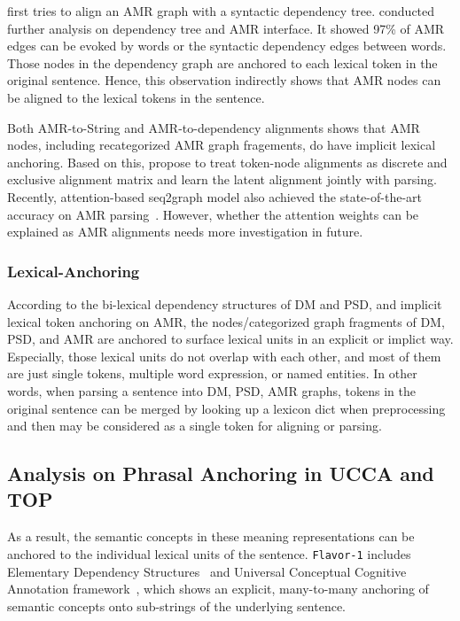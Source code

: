  \citet{chen2017unsupervised}
first tries to align an AMR graph with a syntactic dependency tree.
\citet{szubert2018structured} conducted further analysis on dependency
tree and AMR interface. It showed 97\% of AMR edges can be evoked by
words or the syntactic dependency edges between words.  Those nodes in
the dependency graph are anchored to each lexical token in the
original sentence. Hence, this observation indirectly shows that AMR
nodes can be aligned to the lexical tokens in the sentence.

Both AMR-to-String and AMR-to-dependency alignments shows that AMR
nodes, including recategorized AMR graph fragements, do have implicit
lexical anchoring. Based on this, \citet{lyu2018amr} propose to treat
token-node alignments as discrete and exclusive alignment matrix and
learn the latent alignment jointly with parsing. Recently,
attention-based seq2graph model also achieved the state-of-the-art
accuracy on AMR parsing~\cite{zhang-etal-2018-stog}.  However, whether
the attention weights can be explained as AMR alignments needs more
investigation in future.

\subsubsection{Lexical-Anchoring}
\label{sssec:lex-phr:lex-anchor-summary}
According to the bi-lexical dependency structures of DM and PSD, and
implicit lexical token anchoring on AMR, the nodes/categorized graph
fragments of DM, PSD, and AMR are anchored to surface lexical units in
an explicit or implict way. Especially, those lexical units do not
overlap with each other, and most of them are just single tokens,
multiple word expression, or named entities. In other words, when
parsing a sentence into DM, PSD, AMR graphs, tokens in the original
sentence can be merged by looking up a lexicon dict when preprocessing
and then may be considered as a single token for aligning or parsing.

\subsection{Analysis on Phrasal Anchoring in UCCA and TOP}
\label{ssec:lex-phr:phr-anchor-analysis}

As a result, the semantic concepts in these meaning
representations can be anchored to the individual lexical units of the
sentence. \texttt{Flavor-1} includes Elementary Dependency
Structures~\cite[EDS,][]{oepen2006discriminant} and Universal
Conceptual Cognitive Annotation
framework~\cite[UCCA,][]{abend2013universal}, which shows an explicit,
many-to-many anchoring of semantic concepts onto sub-strings of the
underlying sentence.

